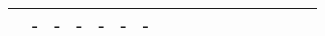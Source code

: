 \documentclass{article}
\begin{document}
\begin{table}
\begin{adjustbox}{totalheight=\baselineskip,}
\begin{tabular}{ccccclp{2em}cp{3em}cp{2em}p{4em}p{3em}p{3.5em}p{3.5em}p{2.5em}p{3em}}
                                           &\multirow{1}{*}{-}
                                               &\multirow{1}{*}{-}
                                                   &\multirow{1}{*}{-}
                                                       &\multirow{1}{*}{-}
                                                           &\multirow{1}{*}{-}
                                                               &\multirow{1}{*}{-}\\
\bottomrule 
\end{tabular}
\end{adjustbox}
\end{table}
\end{document}
